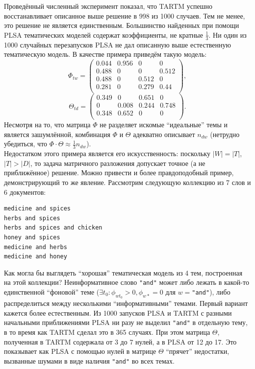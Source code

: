 Проведённый численный эксперимент показал, что TARTM успешно восстанавливает описанное выше решение в 998 из 1000 случаев. Тем не менее, это решение не является единственным. Большинство найденных при помощи PLSA тематических моделей содержат коэффициенты, не кратные $\frac1{3}$. Ни один из 1000 случайных перезапусков PLSA не дал описанную выше естественную тематическую модель. В качестве примера приведём такую модель:
\[
\Phi_{tw} = 
\begin{pmatrix}
    0.044 & 0.956 & 0 & 0 \\
    0.488 & 0 &  0 & 0.512 \\
    0.488 & 0 & 0.512 & 0 \\
    0.281 & 0 & 0.279 & 0.44 \\
\end{pmatrix},
\]
\[
\Theta_{td} = 
\begin{pmatrix}
    0.349 & 0 & 0.651 & 0 \\
    0 & 0.008 & 0.244 & 0.748 \\
    0.348 & 0.652 & 0 & 0 \\
\end{pmatrix}.
\]
Несмотря на то, что матрица $\Phi$ не разделяет искомые ``идеальные'' темы и является зашумлённой, комбинация $\Phi$ и $\Theta$ адекватно описывает $n_{dw}$ (нетрудно убедиться, что $\Phi \cdot \Theta \approx \frac{1}{3} n_{dw}$).\\

Недостатком этого примера является его искусственность: поскольку $|W|=|T|$, $|T|>|D|$, то задача матричного разложения допускает точное (а не приближённое) решение. Можно привести и более правдоподобный пример, демонстрирующий то же явление. Рассмотрим следующую коллекцию из 7 слов и 6 документов:
\begin{verbatim}
medicine and spices
herbs and spices
herbs and spices and chicken
honey and spices
medicine and herbs
medicine and honey 
\end{verbatim}

Как могла бы выглядеть ``хорошая'' тематическая модель из 4 тем, построенная на этой коллекции? Неинформативное слово \texttt{"and"} может либо лежать в какой-то единственной ``фоновой'' теме ($\exists t_0: \phi_{wt_0} > 0, \phi_{w\ast} = 0$ для $w=$\texttt{"and"}), либо распределиться между несколькими ``информативными'' темами. Первый вариант кажется более естественным. Из 1000 запусков PLSA и TARTM с разными начальными приближениями PLSA ни разу не выделил \texttt{"and"} в отдельную тему, в то время как TARTM сделал это в 365 случаях. При этом матрица $\Theta$, полученная в TARTM содержала от 3 до 7 нулей, а в PLSA от 12 до 17. Это показывает как PLSA с помощью нулей в матрице $\Theta$ ``прячет'' недостатки, вызванные шумами в виде наличия \texttt{"and"} во всех темах.

